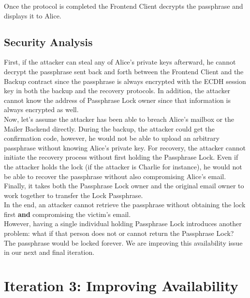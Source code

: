 \documentclass[runningheads]{llncs}
\begin{document}
Once the protocol is completed the Frontend Client decrypts the passphrase and displays it to Alice. 

\subsection{Security Analysis}

First, if the attacker can steal any of Alice's private keys afterward, he cannot decrypt the passphrase sent back and forth between the Frontend Client and the Backup contract since the passphrase is always encrypted with the ECDH session key in both the backup and the recovery protocols. In addition, the attacker cannot know the address of Passphrase Lock owner since that information is always encrypted as well. \\

Now, let's assume the attacker has been able to breach Alice's mailbox or the Mailer Backend directly. During the backup, the attacker could get the confirmation code, however, he would not be able to upload an arbitrary passphrase without knowing Alice's private key. For recovery, the attacker cannot initiate the recovery process without first holding the Passphrase Lock. Even if the attacker holds the lock (if the attacker is Charlie for instance), he would not be able to recover the passphrase without also compromising Alice's email. Finally, it takes both the Passphrase Lock owner and the original email owner to work together to transfer the Lock Passphrase. \\

In the end, an attacker cannot retrieve the passphrase without obtaining the lock first {\bf and} compromising the victim's email. \\

However, having a single individual holding Passphrase Lock introduces another problem: what if that person does not or cannot return the Passphrase Lock? The passphrase would be locked forever. We are improving this availability issue in our next and final iteration. 

\section{Iteration 3: Improving Availability}
\label{iteration3}
\end{document}
